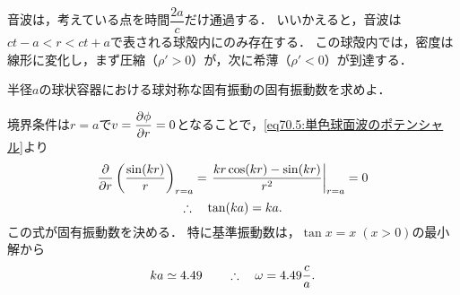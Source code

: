 \begin{kaitou}
音波は，考えている点を時間$\dfrac{2a}{c}$だけ通過する．
いいかえると，音波は$ct-a<r<ct+a$で表される球殻内にのみ存在する．
この球殻内では，密度は線形に変化し，まず圧縮（$\rho'>0$）が，次に希薄（$\rho'<0$）が到達する．



\end{kaitou}





\begin{mondai}{}{}
半径$a$の球状容器における球対称な固有振動の固有振動数を求めよ．
\end{mondai}
\begin{kaitou}

境界条件は$r=a$で$v = \dpdv{\phi}{r} = 0$となることで，\eqref{eq70.5:単色球面波のポテンシャル}より
\[
    \pdv{r} \left( \frac{\sin(kr)}{r} \right)_{r=a} = \eval{ \frac{kr \cos(kr) - \sin(kr)}{r^2} }_{r=a} = 0
\]
\[
    \therefore\quad \tan(ka) = ka.
\]
この式が固有振動数を決める．
特に基準振動数は，$\tan x = x \;(x>0)$の最小解から
\[
    ka \simeq 4.49
    \qquad \therefore\quad \omega = 4.49 \frac{c}{a}.
\]




\end{kaitou}






\BackToTheToc